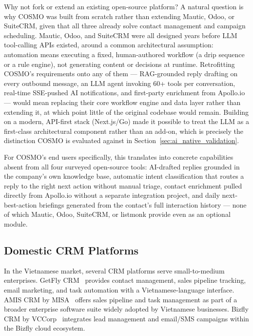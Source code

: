 \documentclass[a4paper]{article}
\begin{document}
Why not fork or extend an existing open-source platform?
A natural question is why COSMO was built from scratch rather than
extending Mautic, Odoo, or SuiteCRM, given that all three already solve
contact management and campaign scheduling. Mautic, Odoo, and SuiteCRM
were all designed years before LLM tool-calling APIs existed, around a
common architectural assumption: automation means executing a fixed,
human-authored workflow (a drip sequence or a rule engine), not
generating content or decisions at runtime. Retrofitting COSMO's
requirements onto any of them --- RAG-grounded reply drafting on every
outbound message, an LLM agent invoking 60+ tools per conversation,
real-time SSE-pushed AI notifications, and first-party enrichment from
Apollo.io --- would mean replacing their core workflow engine and data
layer rather than extending it, at which point little of the original
codebase would remain. Building on a modern, API-first stack
(Next.js/Go) made it possible to treat the LLM as a first-class
architectural component rather than an add-on, which is precisely the
distinction COSMO is evaluated against in
Section~\ref{sec:ai_native_validation}.

For COSMO's end users specifically, this translates into concrete
capabilities absent from all four surveyed open-source tools:
AI-drafted replies grounded in the company's own knowledge base,
automatic intent classification that routes a reply to the right next
action without manual triage, contact enrichment pulled directly from
Apollo.io without a separate integration project, and daily
next-best-action briefings generated from the contact's full
interaction history --- none of which Mautic, Odoo, SuiteCRM, or
listmonk provide even as an optional module.


\subsection{Domestic CRM Platforms}

In the Vietnamese market, several CRM platforms serve small-to-medium 
enterprises. GetFly CRM~\cite{getfly_crm} provides contact management, 
sales pipeline tracking, email marketing, and task automation with a 
Vietnamese-language interface. AMIS CRM by MISA~\cite{amis_crm} 
offers sales pipeline and task management as part of a broader 
enterprise software suite widely adopted by Vietnamese businesses. 
Bizfly CRM by VCCorp~\cite{bizfly_crm} integrates lead management 
and email/SMS campaigns within the Bizfly cloud ecosystem.
\end{document}
